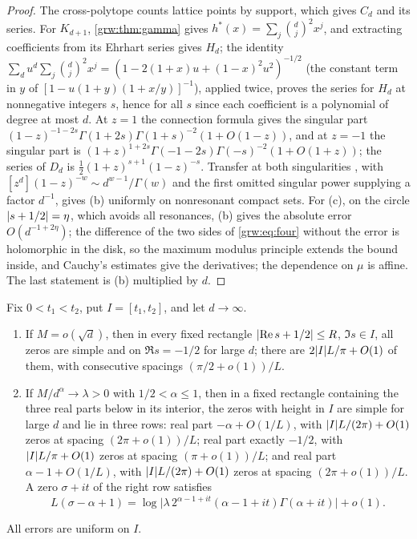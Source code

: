 \begin{proof}
The cross-polytope counts lattice points by support, which gives $C_d$ and
its series. For $K_{d+1}$, \cref{grw:thm:gamma} gives
$h^*(x)=\sum_j\binom dj^2x^j$, and extracting coefficients from its Ehrhart
series gives $H_d$; the identity
$\sum_du^d\sum_j\binom dj^2x^j=(1-2(1+x)u+(1-x)^2u^2)^{-1/2}$ (the constant
term in $y$ of $[1-u(1+y)(1+x/y)]^{-1}$), applied twice, proves the series
for $H_d$ at nonnegative integers $s$, hence for all $s$ since each
coefficient is a polynomial of degree at most $d$. At $z=1$ the connection
formula \cite[15.8.4]{NISTDLMFHypergeometric} gives the singular part
$(1-z)^{-1-2s}\Gamma(1+2s)\Gamma(1+s)^{-2}(1+O(1-z))$, and at $z=-1$ the
singular part is $(1+z)^{1+2s}\Gamma(-1-2s)\Gamma(-s)^{-2}(1+O(1+z))$; the
series of $D_d$ is $\frac12(1+z)^{s+1}(1-z)^{-s}$. Transfer at both
singularities \cite[Chapter~VI]{FlajoletSedgewick2009Analytic}, with
$[z^d](1-z)^{-w}\sim d^{w-1}/\Gamma(w)$ and the first omitted singular power
supplying a factor $d^{-1}$, gives (b) uniformly on nonresonant compact sets.
For (c), on the circle $\lvert s+1/2\rvert=\eta$, which avoids all resonances, (b)
gives the absolute error $O(d^{-1+2\eta})$; the difference of the two sides
of \eqref{grw:eq:four} without the error is holomorphic in the disk, so the
maximum modulus principle extends the bound inside, and Cauchy's estimates
give the derivatives; the dependence on $\mu$ is affine. The last statement
is (b) multiplied by $d$.
\end{proof}

\begin{theorem}\label{grw:thm:strings}
Fix $0<t_1<t_2$, put $I=[t_1,t_2]$, and let $d\to\infty$.
\begin{enumerate}[label=\textup{(\arabic*)}]
\item If $M=o(\sqrt d)$, then in every fixed rectangle
$\lvert\operatorname{Re} s+1/2\rvert\le R$, $\Im s\in I$, all zeros are simple and on
$\Re s=-1/2$ for large $d$; there are $2\lvert I\rvert L/\pi+O(1)$ of them, with
consecutive spacings $(\pi/2+o(1))/L$.
\item If $M/d^\alpha\to\lambda>0$ with $1/2<\alpha\le1$, then in a fixed
rectangle containing the three real parts below in its interior, the zeros
with height in $I$ are simple for large $d$ and lie in three rows: real part
$-\alpha+O(1/L)$, with $\lvert I\rvert L/(2\pi)+O(1)$ zeros at spacing
$(2\pi+o(1))/L$; real part exactly $-1/2$, with $\lvert I\rvert L/\pi+O(1)$ zeros at
spacing $(\pi+o(1))/L$; and real part $\alpha-1+O(1/L)$, with
$\lvert I\rvert L/(2\pi)+O(1)$ zeros at spacing $(2\pi+o(1))/L$. A zero
$\sigma+it$ of the right row satisfies
\[
 L(\sigma-\alpha+1)=\log\bigl\lvert\lambda\,2^{\alpha-1+it}(\alpha-1+it)\Gamma(\alpha+it)\bigr\rvert+o(1).
\]
\end{enumerate}
All errors are uniform on $I$.
\end{theorem}

